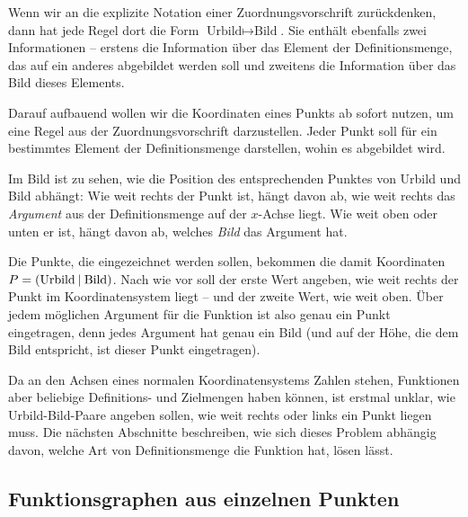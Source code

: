 \documentclass[../../main.tex]{subfiles}
\begin{document}
Wenn wir an die explizite Notation einer Zuordnungsvorschrift zurückdenken, dann hat jede Regel dort die Form $\text{Urbild}\mapsto\text{Bild}$. Sie enthält ebenfalls zwei Informationen -- erstens die Information über das Element der Definitionsmenge, das auf ein anderes abgebildet werden soll und zweitens die Information über das Bild dieses Elements.

Darauf aufbauend wollen wir die Koordinaten eines Punkts ab sofort nutzen, um eine Regel aus der Zuordnungsvorschrift darzustellen. Jeder Punkt soll für ein bestimmtes Element der Definitionsmenge darstellen, wohin es abgebildet wird.


Im Bild ist zu sehen, wie die Position des entsprechenden Punktes von Urbild und Bild abhängt: Wie weit rechts der Punkt ist, hängt davon ab, wie weit rechts das \emph{Argument} aus der Definitionsmenge auf der $x$-Achse liegt. Wie weit oben oder unten er ist, hängt davon ab, welches \emph{Bild} das Argument hat.

Die Punkte, die eingezeichnet werden sollen, bekommen die damit Koordinaten $P=\left(\text{Urbild} \:\middle|\: \text{Bild}\right)$. Nach wie vor soll der erste Wert angeben, wie weit rechts der Punkt im Koordinatensystem liegt -- und der zweite Wert, wie weit oben.
Über jedem möglichen Argument für die Funktion ist also genau ein Punkt eingetragen, denn jedes Argument hat genau ein Bild (und auf der Höhe, die dem Bild entspricht, ist dieser Punkt eingetragen).

Da an den Achsen eines normalen Koordinatensystems Zahlen stehen, Funktionen aber beliebige Definitions- und Zielmengen haben können, ist erstmal unklar, wie Urbild-Bild-Paare angeben sollen, wie weit rechts oder links ein Punkt liegen muss. Die nächsten Abschnitte beschreiben, wie sich dieses Problem abhängig davon, welche Art von Definitionsmenge die Funktion hat, lösen lässt.

\subsection{Funktionsgraphen aus einzelnen Punkten}
\label{sec:abbildungen_graphen_diskret}
\end{document}
